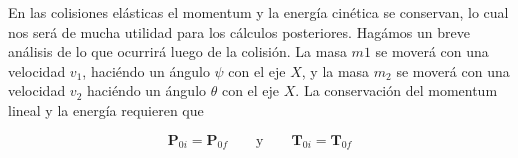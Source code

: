 \documentclass[a4paper,10pt]{article}
\begin{document}
En las colisiones elásticas el momentum y la energía cinética se conservan, lo cual nos 
será de mucha utilidad para los cálculos posteriores. Hagámos un breve análisis de lo 
que ocurrirá luego de la colisión. La masa $m1$ se moverá con una velocidad $v_1$,
haciéndo un ángulo $\psi$ con el eje $X$, y la masa $m_2$ se moverá con una 
velocidad $v_2$ haciéndo un ángulo $\theta$ con el eje $X$. La conservación 
del momentum lineal y la energía requieren que 

\begin{equation}
 \mathbf{P}_{0i} = \mathbf{P}_{0f} \qquad \text{y} \qquad \mathbf{T}_{0i} = \mathbf{T}_{0f}
 \label{eq:ConservacionesColision1}
\end{equation}




\end{document}
